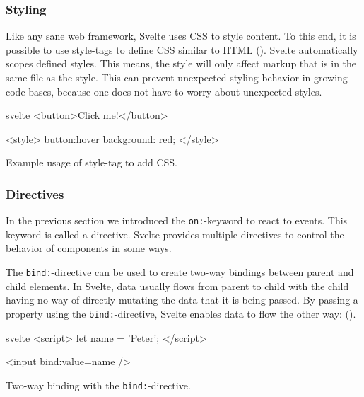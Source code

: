 \subsubsection{Styling}
\label{sec:svelte-styling}
Like any sane web framework, Svelte uses CSS to style content. To this end, it is possible to use style-tags to define CSS similar to HTML (). Svelte automatically scopes defined styles. This means, the style will only affect markup that is in the same file as the style. This can prevent unexpected styling behavior in growing code bases, because one does not have to worry about unexpected styles. 

\begin{listing}[H]
\begin{myminted}{svelte}{}
<button>Click me!</button>

<style>
  button:hover {
    background: red;
  }
</style>
\end{myminted}
\caption{Example usage of style-tag to add CSS.}
\label{fig:svelte-style-tag}
\end{listing}

\subsubsection{Directives}
\label{sec:svelte-directives}
In the previous section we introduced the \texttt{on:}-keyword to react to events. This keyword is called a directive. Svelte provides multiple directives to control the behavior of components in some ways.

The \texttt{bind:}-directive can be used to create two-way bindings between parent and child elements. In Svelte, data usually flows from parent to child with the child having no way of directly mutating the data that it is being passed. By passing a property using the \texttt{bind:}-directive, Svelte enables data to flow the other way:
 ().

\begin{listing}[H]
\begin{myminted}{svelte}{}
<script>
  let name = 'Peter';
</script>

<input bind:value={name} />
\end{myminted}
\caption{Two-way binding with the \texttt{bind:}-directive.}
\label{fig:svelte-bind-directive}
\end{listing}

